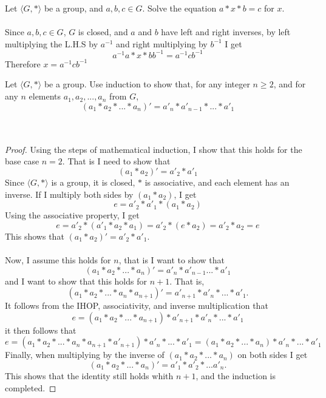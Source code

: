 \documentclass[titlepage]{article}
\newenvironment{problem}[2][Problem]{\begin{trivlist}
\item[\hskip \labelsep {\bfseries #1}\hskip \labelsep {\bfseries #2.}]}{\end{trivlist}}
\begin{document}
\begin{problem}{9}
	Let $\langle G, * \rangle$ be a group, and $a,b,c \in G$. Solve the equation $a*x*b = c$ for $x$.
	\\ \\
	Since $a,b,c \in G$, $G$ is closed, and $a$ and $b$ have left and right inverses, by left multiplying the L.H.S by $a^{-1}$ and right multiplying by $b^{-1}$ I get
	$$ a^{-1}a*x*bb^{-1} = a^{-1}cb^{-1}$$
	Therefore $x = a^{-1}cb^{-1}$
\end{problem}

\begin{problem}{10}
	Let $\langle G,* \rangle$ be a group. Use induction to show that, for any integer $n\geq 2$, and for any $n$ elements $a_1,a_2,...,a_n$ from $G$,
	$$(a_1*a_2*...*a_n)' = a'_n*a'_{n-1}*...*a'_1$$
	\\ \\
	\begin{proof}
	Using the steps of mathematical induction, I show that this holds for the base case $n=2$. That is I need to show that
	$$(a_1 * a_2)' = a'_2 * a'_1 $$
	Since $\langle G,* \rangle$ is a group, it is closed, $*$ is associative, and each element has an inverse. If I multiply both sides by $(a_1*a_2)$, I get
	$$ e = a'_2 * a'_1 * (a_1 * a_2)$$
	Using the associative property, I get
	$$ e =  a'_2 * (a'_1 * a_2 * a_1) = a'_2 * (e * a_2) = a'_2 * a_2 = e$$
	This shows that $(a_1 * a_2)' = a'_2 * a'_1$.\\ \\
	 Now, I assume this holds for $n$, that is I want to show that
	  $$ (a_1*a_2*...*a_n)' = a'_{n} *a'_{n-1} ... * a'_1$$
	  and I want to show that this holds for $n+1$. That is, 
	$$(a_1*a_2*...*a_n*a_{n+1})' = a'_{n+1} * a'_{n} * ... * a'_1.$$
	It follows from the IHOP, associativity, and inverse multiplication that
	$$e=(a_1*a_2*...*a_{n+1}) * a'_{n+1} * a'_{n} * ... * a'_1 $$
	it then follows that
	$$ e=(a_1*a_2*...*a_{n}*a_{n+1} * a'_{n+1}) * a'_{n} * ... * a'_1 = (a_1*a_2*...*a_{n}) * a'_{n} * ... * a'_1 $$
	Finally, when multiplying by the inverse of $(a_1 * a_2 *...* a_n)$ on both sides I get
	$$(a_1 * a_2 *... * a_n)' = a'_1 * a'_2 *... a'_n.$$
	This shows that the identity still holds whith $n+1$, and the induction is completed.
	\end{proof}
	
\end{problem}
\end{document}
